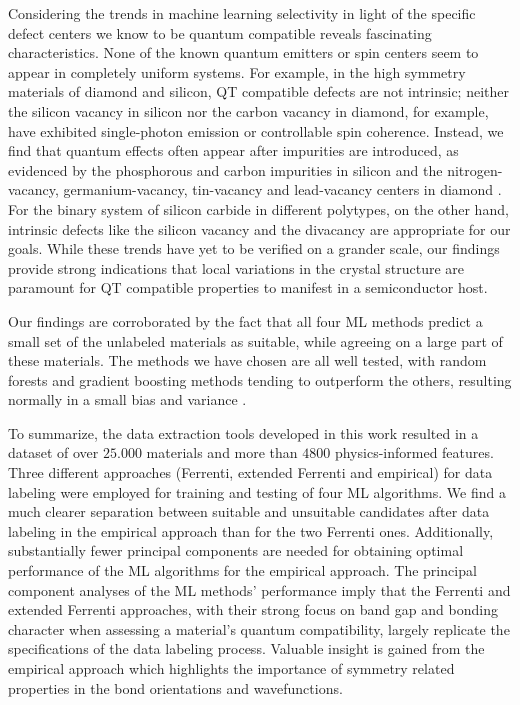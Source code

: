 \documentclass[superscriptaddress,unsortedaddress,
 amsmath,amssymb,
 aps,
]{revtex4-2}
\begin{document}
Considering the trends in machine learning selectivity in light of the specific defect centers we know to be quantum compatible reveals fascinating characteristics. None of the known quantum emitters or spin centers seem to appear in completely uniform systems. For example, in the high symmetry materials of diamond and silicon, QT compatible defects are not intrinsic; neither the silicon vacancy in silicon nor the carbon vacancy in diamond, for example,  have exhibited single-photon emission or controllable spin coherence. Instead, we find that quantum effects often appear after impurities are introduced, as evidenced by the phosphorous and carbon impurities in silicon \cite{He2019,Redjem2020} and the nitrogen-vacancy, germanium-vacancy, tin-vacancy and lead-vacancy centers in diamond \cite{Thiering2020}. 
For the binary system of silicon carbide in different polytypes, on the other hand, intrinsic defects like the silicon vacancy and the divacancy are appropriate for our goals. 
While these trends have yet to be verified on a grander scale, our findings provide strong indications that local variations in the crystal structure are paramount for QT compatible properties to manifest in a semiconductor host. 

Our findings are corroborated by the fact that all four ML methods predict a small set of the unlabeled materials as suitable, while agreeing on a large part of these materials. 
The methods we have chosen are all well tested, with random forests and gradient boosting methods tending to outperform the others, resulting normally in a small bias and variance \cite{Hastie2009,Mehta2019,Murphy2012}. 

To summarize, the data extraction tools developed in this work resulted in a dataset of over $25.000$ materials and more than $4800$ physics-informed features. Three different approaches (Ferrenti, extended Ferrenti and empirical) for data labeling were employed for training and testing of four ML algorithms. 
We find a much clearer separation between suitable and unsuitable candidates after data labeling in the empirical approach than for the two Ferrenti ones. 
Additionally, substantially fewer principal components are needed for obtaining optimal performance of the ML algorithms for the empirical approach. 
The principal component analyses of the ML methods' performance imply that the Ferrenti and extended Ferrenti approaches, with their strong focus on band gap and bonding character when assessing a material's quantum compatibility, largely replicate the specifications of the data labeling process. 
Valuable insight is gained from the empirical approach which highlights the importance of symmetry related properties in the bond orientations and wavefunctions. 
\end{document}
